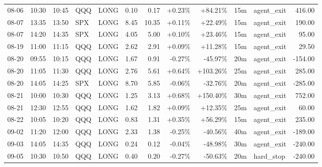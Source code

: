\documentclass[11pt,a4paper]{article}
\begin{document}
\begin{center}
\begin{longtable}{>{\color{txtmain}}l l l l l r r r r r >{\color{txtmain}}l r}
08-06 & 10:30 & 10:45 & QQQ & LONG & 0.10 & 0.17 & \textcolor{wingreen}{+0.23\%} & \textcolor{wingreen}{+84.21\%} & 15m & agent\_exit & \textcolor{wingreen}{416.00} \\
08-07 & 13:35 & 13:50 & SPX & LONG & 8.45 & 10.35 & \textcolor{wingreen}{+0.11\%} & \textcolor{wingreen}{+22.49\%} & 15m & agent\_exit & \textcolor{wingreen}{190.00} \\
08-07 & 14:20 & 14:35 & SPX & LONG & 4.05 & 5.00 & \textcolor{wingreen}{+0.10\%} & \textcolor{wingreen}{+23.46\%} & 15m & agent\_exit & \textcolor{wingreen}{95.00} \\
08-19 & 11:00 & 11:15 & QQQ & LONG & 2.62 & 2.91 & \textcolor{wingreen}{+0.09\%} & \textcolor{wingreen}{+11.28\%} & 15m & agent\_exit & \textcolor{wingreen}{29.50} \\
08-20 & 09:55 & 10:15 & QQQ & LONG & 1.67 & 0.91 & \textcolor{lossred}{-0.27\%} & \textcolor{lossred}{-45.97\%} & 20m & agent\_exit & \textcolor{lossred}{-154.00} \\
08-20 & 11:05 & 11:30 & QQQ & LONG & 2.76 & 5.61 & \textcolor{wingreen}{+0.64\%} & \textcolor{wingreen}{+103.26\%} & 25m & agent\_exit & \textcolor{wingreen}{285.00} \\
08-20 & 14:05 & 14:25 & SPX & LONG & 8.70 & 5.85 & \textcolor{lossred}{-0.06\%} & \textcolor{lossred}{-32.76\%} & 20m & agent\_exit & \textcolor{lossred}{-285.00} \\
08-21 & 10:00 & 10:30 & QQQ & LONG & 1.25 & 3.13 & \textcolor{wingreen}{+0.68\%} & \textcolor{wingreen}{+150.40\%} & 30m & agent\_exit & \textcolor{wingreen}{752.00} \\
08-21 & 12:30 & 12:55 & QQQ & LONG & 1.62 & 1.82 & \textcolor{wingreen}{+0.09\%} & \textcolor{wingreen}{+12.35\%} & 25m & agent\_exit & \textcolor{wingreen}{60.00} \\
08-22 & 10:05 & 10:20 & QQQ & LONG & 0.83 & 1.31 & \textcolor{wingreen}{+0.35\%} & \textcolor{wingreen}{+56.29\%} & 15m & agent\_exit & \textcolor{wingreen}{235.00} \\
09-02 & 11:20 & 12:00 & QQQ & LONG & 2.33 & 1.38 & \textcolor{lossred}{-0.25\%} & \textcolor{lossred}{-40.56\%} & 40m & agent\_exit & \textcolor{lossred}{-189.00} \\
09-03 & 14:05 & 14:35 & QQQ & LONG & 0.24 & 0.12 & \textcolor{lossred}{-0.04\%} & \textcolor{lossred}{-48.98\%} & 30m & agent\_exit & \textcolor{lossred}{-240.00} \\
09-05 & 10:30 & 10:50 & QQQ & LONG & 0.40 & 0.20 & \textcolor{lossred}{-0.27\%} & \textcolor{lossred}{-50.63\%} & 20m & hard\_stop & \textcolor{lossred}{-240.00} \\

\end{longtable}
\end{center}
\end{document}
